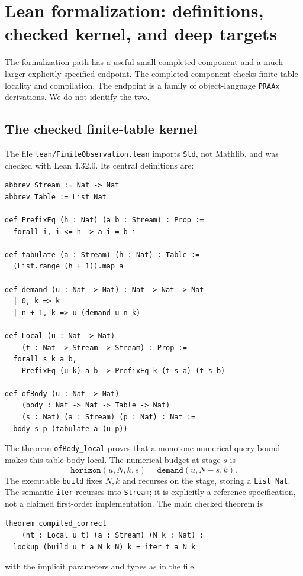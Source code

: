 \section{Lean formalization: definitions, checked kernel, and deep targets}
\label{sec:formalization}

The formalization path has a useful small completed component and a much
larger explicitly specified endpoint. The completed component checks
finite-table locality and compilation. The endpoint is a family of
object-language \texttt{PRAAx} derivations. We do not identify the two.

\subsection{The checked finite-table kernel}

The file \texttt{lean/FiniteObservation.lean} imports \texttt{Std}, not
Mathlib, and was checked with Lean 4.32.0. Its central definitions are:
\begin{lstlisting}
abbrev Stream := Nat -> Nat
abbrev Table := List Nat

def PrefixEq (h : Nat) (a b : Stream) : Prop :=
  forall i, i <= h -> a i = b i

def tabulate (a : Stream) (h : Nat) : Table :=
  (List.range (h + 1)).map a

def demand (u : Nat -> Nat) : Nat -> Nat -> Nat
  | 0, k => k
  | n + 1, k => u (demand u n k)

def Local (u : Nat -> Nat)
    (t : Nat -> Stream -> Stream) : Prop :=
  forall s k a b,
    PrefixEq (u k) a b -> PrefixEq k (t s a) (t s b)

def ofBody (u : Nat -> Nat)
    (body : Nat -> Nat -> Table -> Nat)
    (s : Nat) (a : Stream) (p : Nat) : Nat :=
  body s p (tabulate a (u p))
\end{lstlisting}

The theorem \texttt{ofBody\_local} proves that a monotone numerical query
bound makes this table body local. The numerical budget at stage $s$ is
\[
 \mathtt{horizon}(u,N,k,s)=\mathtt{demand}(u,N-s,k).
\]
The executable \texttt{build} fixes $N,k$ and recurses on the stage,
storing a \texttt{List Nat}. The semantic \texttt{iter} recurses into
\texttt{Stream}; it is explicitly a reference specification, not a
claimed first-order implementation. The main checked theorem is
\begin{lstlisting}
theorem compiled_correct
    (ht : Local u t) (a : Stream) (N k : Nat) :
  lookup (build u t a N k N) k = iter t a N k
\end{lstlisting}
with the implicit parameters and types as in the file.

